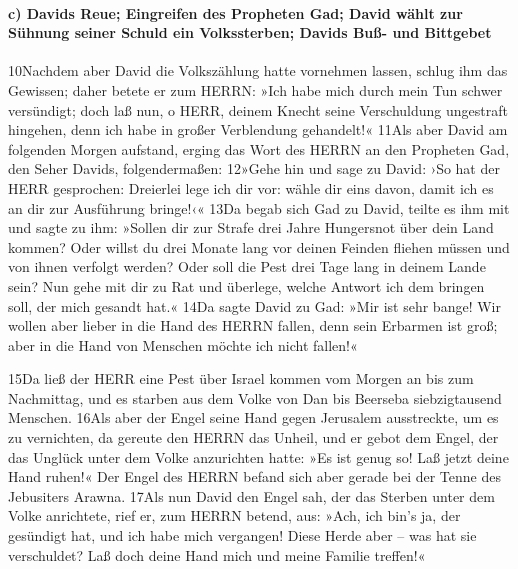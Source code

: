 \hypertarget{c-davids-reue-eingreifen-des-propheten-gad-david-wuxe4hlt-zur-suxfchnung-seiner-schuld-ein-volkssterben-davids-buuxdf--und-bittgebet}{%
\paragraph{c) Davids Reue; Eingreifen des Propheten Gad; David wählt zur
Sühnung seiner Schuld ein Volkssterben; Davids Buß- und
Bittgebet}\label{c-davids-reue-eingreifen-des-propheten-gad-david-wuxe4hlt-zur-suxfchnung-seiner-schuld-ein-volkssterben-davids-buuxdf--und-bittgebet}}

10Nachdem aber David die Volkszählung hatte vornehmen lassen, schlug ihm
das Gewissen; daher betete er zum HERRN: »Ich habe mich durch mein Tun
schwer versündigt; doch laß nun, o HERR, deinem Knecht seine
Verschuldung ungestraft hingehen, denn ich habe in großer Verblendung
gehandelt!« 11Als aber David am folgenden Morgen aufstand, erging das
Wort des HERRN an den Propheten Gad, den Seher Davids, folgendermaßen:
12»Gehe hin und sage zu David: ›So hat der HERR gesprochen: Dreierlei
lege ich dir vor: wähle dir eins davon, damit ich es an dir zur
Ausführung bringe!‹« 13Da begab sich Gad zu David, teilte es ihm mit und
sagte zu ihm: »Sollen dir zur Strafe drei Jahre Hungersnot über dein
Land kommen? Oder willst du drei Monate lang vor deinen Feinden fliehen
müssen und von ihnen verfolgt werden? Oder soll die Pest drei Tage lang
in deinem Lande sein? Nun gehe mit dir zu Rat und überlege, welche
Antwort ich dem bringen soll, der mich gesandt hat.« 14Da sagte David zu
Gad: »Mir ist sehr bange! Wir wollen aber lieber in die Hand des HERRN
fallen, denn sein Erbarmen ist groß; aber in die Hand von Menschen
möchte ich nicht fallen!«

15Da ließ der HERR eine Pest über Israel kommen vom Morgen an bis zum
Nachmittag, und es starben aus dem Volke von Dan bis Beerseba
siebzigtausend Menschen. 16Als aber der Engel seine Hand gegen Jerusalem
ausstreckte, um es zu vernichten, da gereute den HERRN das Unheil, und
er gebot dem Engel, der das Unglück unter dem Volke anzurichten hatte:
»Es ist genug so! Laß jetzt deine Hand ruhen!« Der Engel des HERRN
befand sich aber gerade bei der Tenne des Jebusiters Arawna. 17Als nun
David den Engel sah, der das Sterben unter dem Volke anrichtete, rief
er, zum HERRN betend, aus: »Ach, ich bin's ja, der gesündigt hat, und
ich habe mich vergangen! Diese Herde aber -- was hat sie verschuldet?
Laß doch deine Hand mich und meine Familie treffen!«

